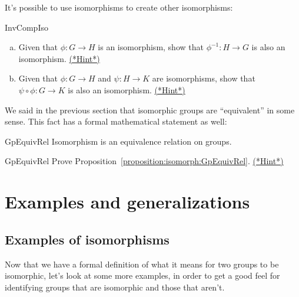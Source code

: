 It's possible to use isomorphisms to create other isomorphisms:

\begin{exercise}{InvCompIso}
\begin{enumerate}[(a)]
\item
Given that  $\phi : G \rightarrow H$ is an  isomorphism, show that  $\phi^{-1} : H \rightarrow G$ is also an  isomorphism.
\hyperref[sec:isomorph:hints]{(*Hint*)}
\item
Given that  $\phi : G \rightarrow H$ and $\psi : H \rightarrow K$ are  isomorphisms, show that  $\psi \circ\phi:G \rightarrow K$ is also an  isomorphism.
\hyperref[sec:isomorph:hints]{(*Hint*)}
\end{enumerate}
\end{exercise}

We said in the previous section that isomorphic groups are ``equivalent'' in some sense. This fact has a formal mathematical statement as well:

\begin{prop}{GpEquivRel}
Isomorphism is an equivalence relation on groups. 
\end{prop}

\begin{exercise}{GpEquivRel}
Prove Proposition~\ref{proposition:isomorph:GpEquivRel}.
\hyperref[sec:isomorph:hints]{(*Hint*)}
\end{exercise}

\section{Examples and generalizations}
\label{sec:Isomorphism:ExampleAndGeneralization}

\subsection{Examples of isomorphisms}
Now that we have a formal definition of what it means for two groups to be isomorphic, let's look at some more examples, in order to get a good feel for identifying groups that are isomorphic and those that aren't.

